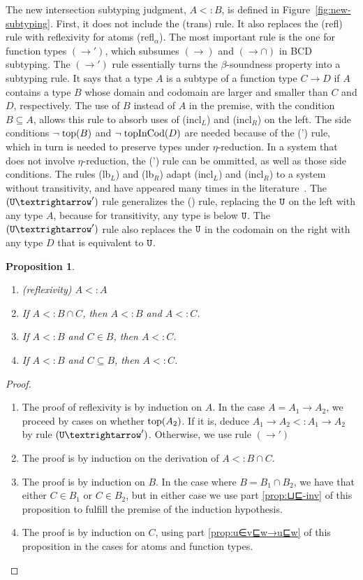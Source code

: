 \documentclass{article}
\newtheorem{proposition}[theorem]{Proposition}
\begin{document}
The new intersection subtyping judgment, $A <: B$, is defined in
Figure~\ref{fig:new-subtyping}. First, it does not include the (trans)
rule.  It also replaces the (refl) rule with reflexivity for atoms
(refl$_\alpha$). The most important rule is the one for function types
$(→')$, which subsumes $(→)$ and $({→}{∩})$ in BCD subtyping.  The
$(→')$ rule essentially turns the $\beta$-soundness property into a
subtyping rule. It says that a type $A$ is a subtype of a function
type $C → D$ if $A$ contains a type $B$ whose domain and codomain are
larger and smaller than $C$ and $D$, respectively. The use of $B$
instead of $A$ in the premise, with the condition $B ⊆ A$, allows this
rule to absorb uses of (incl$_L$) and (incl$_R$) on the left.  The
side conditions $\neg\;\mathrm{top}(B)$ and $\neg\;\mathrm{topInCod}(D)$ are needed
because of the (') rule, which in turn is needed to preserve
types under $\eta$-reduction.  In a system that does not involve
$\eta$-reduction, the (') rule can be ommitted, as well as
those side conditions. The rules (lb$_L$) and (lb$_R$) adapt
(incl$_L$) and (incl$_R$) to a system without transitivity, and have
appeared many times in the literature~\citep{Bakel:1995aa}.  The
$(\TOP{→}')$ rule generalizes the () rule, replacing the $\mathtt{U}$
on the left with any type $A$, because for transitivity, any type is
below $\mathtt{U}$. The $(\TOP{→}')$ rule also replaces the $\mathtt{U}$ in the
codomain on the right with any type $D$ that is equivalent to $\mathtt{U}$.


\begin{proposition}\ 
  \begin{enumerate}
  \item (reflexivity) $A <: A$ \label{prop:refl}
  \item If $A <: B ∩ C$, then $A <: B$ and $A <: C$. \label{prop:⊔⊑-inv}
  \item If $A <: B$ and $C ∈ B$, then $A <: C$.\label{prop:u∈v⊑w→u⊑w}
  \item If $A <: B$ and $C ⊆ B$, then $A <: C$.\label{prop:u⊆v⊑w→u⊑w}
  \end{enumerate}
\end{proposition}
\begin{proof}\ 
  \begin{enumerate}
    \item The proof of reflexivity is by induction on $A$. In the case
      $A = A_1 → A_2$, we proceed by cases on whether $\mathrm{top}(A_2)$.
      If it is, deduce $A_1 → A_2 <: A_1 → A_2$ by rule $(\TOP{→}')$.
      Otherwise, we use rule $(→')$
    \item The proof is by induction on the derivation of $A <: B ∩ C$.
    \item The proof is by induction on $B$. In the case where $B = B_1 ∩ B_2$,
      we have that either $C ∈ B_1$ or $C ∈ B_2$, but in
      either case we use part \ref{prop:⊔⊑-inv} of this proposition to
      fulfill the premise of the induction hypothesis.
    \item The proof  is by induction on $C$, using part \ref{prop:u∈v⊑w→u⊑w}
      of this proposition in the cases for atoms and function types. 
  \end{enumerate}
\end{proof}
\end{document}
